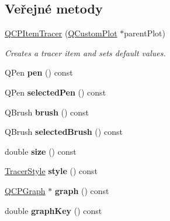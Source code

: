 \subsection*{Veřejné metody}
\begin{DoxyCompactItemize}
\item 
\hyperlink{classQCPItemTracer_adc5ca846eeac323db4aa1fc4081e36be}{Q\+C\+P\+Item\+Tracer} (\hyperlink{classQCustomPlot}{Q\+Custom\+Plot} $\ast$parent\+Plot)
\begin{DoxyCompactList}\small\item\em Creates a tracer item and sets default values. \end{DoxyCompactList}\item 
\hypertarget{classQCPItemTracer_a1f51b61e98c276298a0874d5e89707f0}{}Q\+Pen {\bfseries pen} () const \label{classQCPItemTracer_a1f51b61e98c276298a0874d5e89707f0}

\item 
\hypertarget{classQCPItemTracer_ad75e5d2d868dbedc176f7911091f379b}{}Q\+Pen {\bfseries selected\+Pen} () const \label{classQCPItemTracer_ad75e5d2d868dbedc176f7911091f379b}

\item 
\hypertarget{classQCPItemTracer_af07527750cfb6afc3c0ba4bec012011f}{}Q\+Brush {\bfseries brush} () const \label{classQCPItemTracer_af07527750cfb6afc3c0ba4bec012011f}

\item 
\hypertarget{classQCPItemTracer_afed284222253083375bfd21d3d4dbc30}{}Q\+Brush {\bfseries selected\+Brush} () const \label{classQCPItemTracer_afed284222253083375bfd21d3d4dbc30}

\item 
\hypertarget{classQCPItemTracer_a2607fcb3d01e90773ea1532fd6803760}{}double {\bfseries size} () const \label{classQCPItemTracer_a2607fcb3d01e90773ea1532fd6803760}

\item 
\hypertarget{classQCPItemTracer_a871832dace1709f877c3136fac7ae1ec}{}\hyperlink{classQCPItemTracer_a2f05ddb13978036f902ca3ab47076500}{Tracer\+Style} {\bfseries style} () const \label{classQCPItemTracer_a871832dace1709f877c3136fac7ae1ec}

\item 
\hypertarget{classQCPItemTracer_a74c90da0e6730839b8d7cf6445a4ec1f}{}\hyperlink{classQCPGraph}{Q\+C\+P\+Graph} $\ast$ {\bfseries graph} () const \label{classQCPItemTracer_a74c90da0e6730839b8d7cf6445a4ec1f}

\item 
\hypertarget{classQCPItemTracer_a361c5c9b93bdf4588fc49bc3097529ad}{}double {\bfseries graph\+Key} () const \label{classQCPItemTracer_a361c5c9b93bdf4588fc49bc3097529ad}


\end{DoxyCompactItemize}
